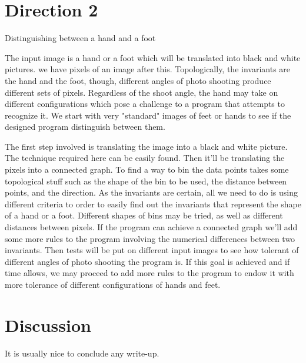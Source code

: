 \documentclass[11pt]{article}
\begin{document}
\section{Direction 2}
Distinguishing between a hand and a foot

The input image is a hand or a foot which will be translated into black and white 
pictures. we have pixels of an image after this. Topologically, the invariants are 
the hand and the foot, though, different angles of photo shooting produce different 
sets of pixels. Regardless of the shoot angle, the hand may take on different 
configurations which pose a challenge to a program that attempts to recognize it. 
We start with very "standard" images of feet or hands to see if the designed program 
distinguish between them. 

The first step involved is translating the image into a black and white picture. The 
technique required here can be easily found. Then it'll be  translating the pixels 
into a connected graph. To find a way to bin the data points takes some topological 
stuff such as the shape of the bin to be used, the distance between points, and the 
direction. As the invariants are certain, all we need to do is using different criteria 
to order to easily find out the invariants that represent the shape of a hand or a foot. 
Different shapes of bins may be tried, as well as different distances between pixels. 
If the program can achieve a connected graph we'll add some more rules to the program 
involving the numerical differences between two invariants. Then tests will be put on 
different input images to see how tolerant of different angles of photo shooting the 
program is. If this goal is achieved and if time allows, we may proceed to add more 
rules to the program to endow it with more tolerance of different configurations of 
hands and feet. 

\section{Discussion}
It is usually nice to conclude any write-up.
\end{document}
